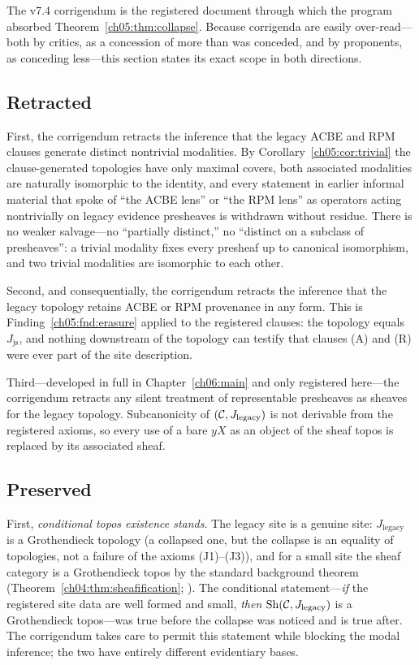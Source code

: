 The v7.4 corrigendum is the registered document through which the program
absorbed Theorem~\ref{ch05:thm:collapse}. Because corrigenda are easily
over-read---both by critics, as a concession of more than was conceded, and
by proponents, as conceding less---this section states its exact scope in
both directions.

\subsection{Retracted}

First, the corrigendum retracts the inference that the legacy ACBE and RPM
clauses generate distinct nontrivial modalities. By
Corollary~\ref{ch05:cor:trivial} the clause-generated topologies have only
maximal covers, both associated modalities are naturally isomorphic to the
identity, and every statement in earlier informal material that spoke of
``the ACBE lens'' or ``the RPM lens'' as operators acting nontrivially on
legacy evidence presheaves is withdrawn without residue. There is no weaker
salvage---no ``partially distinct,'' no ``distinct on a subclass of
presheaves'': a trivial modality fixes every presheaf up to canonical
isomorphism, and two trivial modalities are isomorphic to each other.

Second, and consequentially, the corrigendum retracts the inference that the
legacy topology retains ACBE or RPM provenance in any form. This is
Finding~\ref{ch05:fnd:erasure} applied to the registered clauses: the
topology equals $J_{\mathrm{js}}$, and nothing downstream of the topology
can testify that clauses (A) and (R) were ever part of the site
description.

Third---developed in full in Chapter~\ref{ch06:main} and only registered
here---the corrigendum retracts any silent treatment of representable
presheaves as sheaves for the legacy topology. Subcanonicity of
$(\mathcal{C},J_{\mathrm{legacy}})$ is not derivable from the registered axioms, so
every use of a bare $yX$ as an object of the sheaf topos is replaced by its
associated sheaf.

\subsection{Preserved}

First, \emph{conditional topos existence stands}. The legacy site is a
genuine site: $J_{\mathrm{legacy}}$ is a Grothendieck topology (a collapsed
one, but the collapse is an equality of topologies, not a failure of the
axioms (J1)--(J3)), and for a small site the sheaf category is a
Grothendieck topos by the standard background theorem
(Theorem~\ref{ch04:thm:sheafification}; \cite{maclane,johnstone}). The
conditional statement---\emph{if} the registered site data are well formed
and small, \emph{then} $\mathrm{Sh}(\mathcal{C},J_{\mathrm{legacy}})$ is a Grothendieck
topos---was true before the collapse was noticed and is true after. The
corrigendum takes care to permit this statement while blocking the modal
inference; the two have entirely different evidentiary bases.

